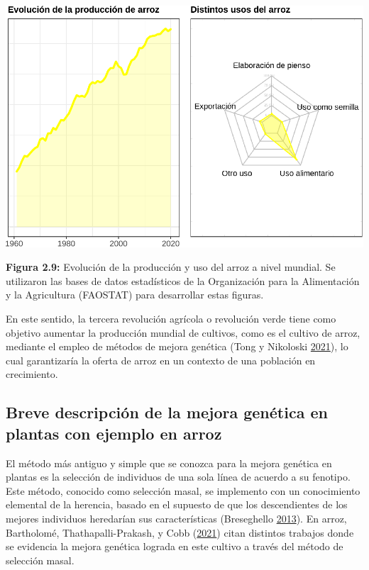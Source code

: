 \documentclass[11pt,spanish,a4paper,oneside,]{book} %
\begin{document}
\begin{center}\includegraphics[width=1\linewidth]{figures/Graf_arroz} \end{center}

\begin{center}
\textbf{Figura 2.9:} Evolución de la producción y uso del arroz a nivel mundial. Se utilizaron las bases de datos estadísticos de la Organización para la Alimentación y la Agricultura (FAOSTAT) para desarrollar estas figuras.

\end{center}

En este sentido, la tercera revolución agrícola o revolución verde tiene como objetivo aumentar la producción mundial de cultivos, como es el cultivo de arroz, mediante el empleo de métodos de mejora genética (Tong y Nikoloski \protect\hyperlink{ref-cite:7}{2021}), lo cual garantizaría la oferta de arroz en un contexto de una población en crecimiento.

\hypertarget{breve-descripciuxf3n-de-la-mejora-genuxe9tica-en-plantas-con-ejemplo-en-arroz}{%
\subsection{Breve descripción de la mejora genética en plantas con ejemplo en arroz}\label{breve-descripciuxf3n-de-la-mejora-genuxe9tica-en-plantas-con-ejemplo-en-arroz}}

El método más antiguo y simple que se conozca para la mejora genética en plantas es la selección de individuos de una sola línea de acuerdo a su fenotipo. Este método, conocido como selección masal, se implemento con un conocimiento elemental de la herencia, basado en el supuesto de que los descendientes de los mejores individuos heredarían sus características (Breseghello \protect\hyperlink{ref-cite:57}{2013}). En arroz, Bartholomé, Thathapalli-Prakash, y Cobb (\protect\hyperlink{ref-cite:58}{2021}) citan distintos trabajos donde se evidencia la mejora genética lograda en este cultivo a través del método de selección masal.
\end{document}
